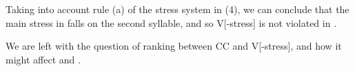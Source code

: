 \documentclass[12pt,draft]{article}
\begin{document}
Taking into account rule (a) of the stress system in (4), we can conclude that the main stress in \textsl{} falls on the second syllable, and so {\sc *V[-stress]} is not violated in \textsl{\textipa{[ht5ft]}}.

We are left with the question of ranking between {\sc *CC} and {\sc *V[-stress]}, and how it might affect \textsl{} and \textsl{}.







\end{document}

